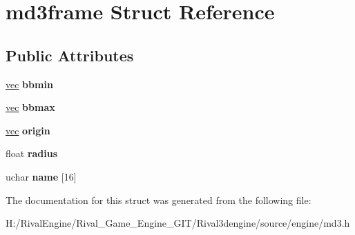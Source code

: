\hypertarget{structmd3frame}{}\section{md3frame Struct Reference}
\label{structmd3frame}
\subsection*{Public Attributes}
\begin{DoxyCompactItemize}
\item 
\mbox{\label{structmd3frame_a6206794af3b2c771b4aead3253fa4215}} 
\hyperlink{structvec}{vec} {\bfseries bbmin}
\item 
\mbox{\label{structmd3frame_a8caa947e2225144ea75942173f1393ea}} 
\hyperlink{structvec}{vec} {\bfseries bbmax}
\item 
\mbox{\label{structmd3frame_a8352df29c625681c23d7114da844172f}} 
\hyperlink{structvec}{vec} {\bfseries origin}
\item 
\mbox{\label{structmd3frame_a2ad54f6e190deb889fced2b84877a90e}} 
float {\bfseries radius}
\item 
\mbox{\label{structmd3frame_a92197a51527e9963523931dd0a441a4f}} 
uchar {\bfseries name} \mbox{[}16\mbox{]}
\end{DoxyCompactItemize}


The documentation for this struct was generated from the following file\+:\begin{DoxyCompactItemize}
\item 
H\+:/\+Rival\+Engine/\+Rival\+\_\+\+Game\+\_\+\+Engine\+\_\+\+G\+I\+T/\+Rival3dengine/source/engine/md3.\+h\end{DoxyCompactItemize}
